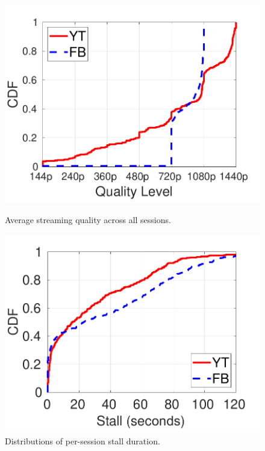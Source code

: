 \begin{figure}[t]
	\centering
	\begin{minipage}{.4\textwidth}
		\centering
		\includegraphics[width=\linewidth]{figs/lime/average_quality.pdf} \vspace{-.25in}
		\caption{\small Average streaming quality across all sessions.}
		\label{fig:average_quality}
	\end{minipage}
	\begin{minipage}{.4\textwidth}
		\centering
		\includegraphics[width=\linewidth]{figs/lime/len_of_stall.pdf} \vspace{-.25in}
		\caption{\small Distributions of per-session stall duration.}
		\label{fig:stall_per_session}
	\end{minipage}
\end{figure}


